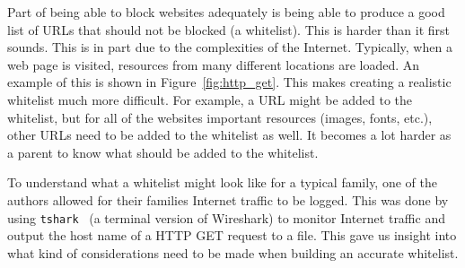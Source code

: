 Part of being able to block websites adequately is being able to produce a
good list of URLs that should not be blocked (a whitelist). This is harder than
it first sounds. This is in part due to the complexities of the Internet.
Typically, when a web page is visited, resources from many different locations
are loaded. An example of this is shown in Figure~\ref{fig:http_get}. This
makes creating a realistic whitelist much more difficult. For example, a URL
might be added to the whitelist, but for all of the websites important
resources (images, fonts, etc.), other URLs need to be added to the whitelist
as well. It becomes a lot harder as a parent to know what should be added to
the whitelist.

To understand what a whitelist might look like for a typical family, one of the
authors allowed for their families Internet traffic to be logged. This was done
by using \texttt{tshark}~\cite{tshark} (a terminal version of Wireshark) to
monitor Internet traffic and output the host name of a HTTP GET request to a
file. This gave us insight into what kind of considerations need to be made
when building an accurate whitelist.

